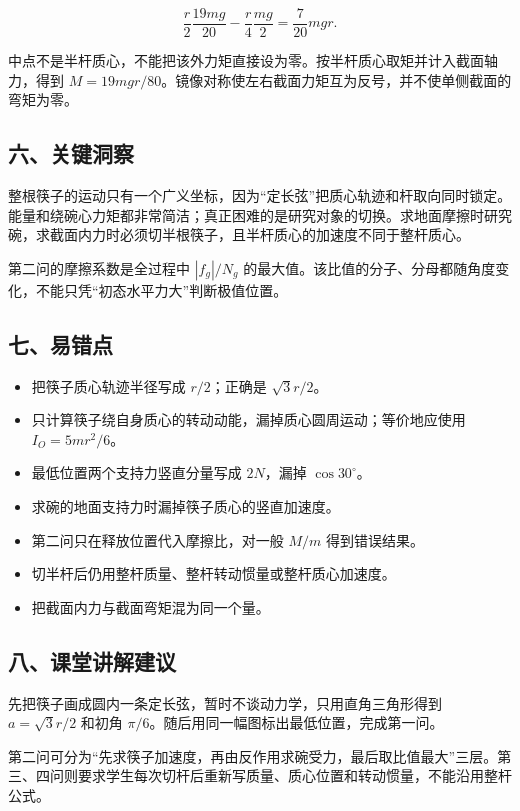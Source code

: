 \documentclass[12pt,a4paper,UTF8]{ctexart}
\newcommand{\tightlist}{\setlength{\itemsep}{0pt}\setlength{\parskip}{0pt}}
\begin{document}
\[\frac r2\frac{19mg}{20}-\frac r4\frac{mg}{2}
=\frac7{20}mgr.\]

中点不是半杆质心，不能把该外力矩直接设为零。按半杆质心取矩并计入截面轴力，得到
\(M=19mgr/80\)。镜像对称使左右截面力矩互为反号，并不使单侧截面的弯矩为零。

\subsection{六、关键洞察}\label{ux516dux5173ux952eux6d1eux5bdf-6}

整根筷子的运动只有一个广义坐标，因为``定长弦''把质心轨迹和杆取向同时锁定。能量和绕碗心力矩都非常简洁；真正困难的是研究对象的切换。求地面摩擦时研究碗，求截面内力时必须切半根筷子，且半杆质心的加速度不同于整杆质心。

第二问的摩擦系数是全过程中 \(|f_g|/N_g\)
的最大值。该比值的分子、分母都随角度变化，不能只凭``初态水平力大''判断极值位置。

\subsection{七、易错点}\label{ux4e03ux6613ux9519ux70b9-6}

\begin{itemize}
\tightlist
\item
  把筷子质心轨迹半径写成 \(r/2\)；正确是 \(\sqrt3r/2\)。
\item
  只计算筷子绕自身质心的转动动能，漏掉质心圆周运动；等价地应使用
  \(I_O=5mr^2/6\)。
\item
  最低位置两个支持力竖直分量写成 \(2N\)，漏掉 \(\cos30^\circ\)。
\item
  求碗的地面支持力时漏掉筷子质心的竖直加速度。
\item
  第二问只在释放位置代入摩擦比，对一般 \(M/m\) 得到错误结果。
\item
  切半杆后仍用整杆质量、整杆转动惯量或整杆质心加速度。
\item
  把截面内力与截面弯矩混为同一个量。
\end{itemize}

\subsection{八、课堂讲解建议}\label{ux516bux8bfeux5802ux8bb2ux89e3ux5efaux8bae-6}

先把筷子画成圆内一条定长弦，暂时不谈动力学，只用直角三角形得到
\(a=\sqrt3r/2\) 和初角
\(\pi/6\)。随后用同一幅图标出最低位置，完成第一问。

第二问可分为``先求筷子加速度，再由反作用求碗受力，最后取比值最大''三层。第三、四问则要求学生每次切杆后重新写质量、质心位置和转动惯量，不能沿用整杆公式。
\end{document}
